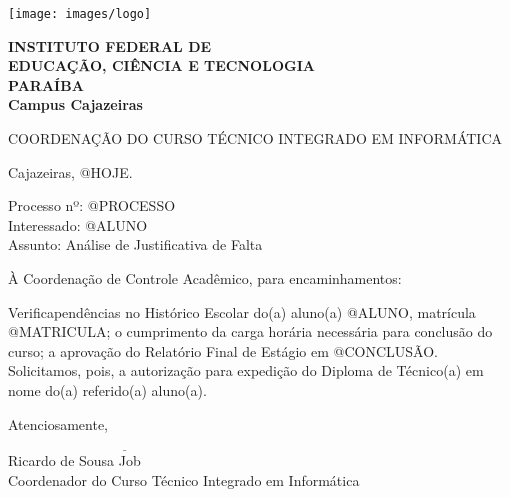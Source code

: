 \documentclass[a4paper, 12pt]{letter}
\begin{document}
\hspace{1.4cm}
\begin{minipage}{.19\textwidth}
    \texttt{[image: images/logo]}
\end{minipage}
\begin{minipage}[t]{\textwidth}
        \vspace{.001cm}
        {\bf
            {\selectfont
                INSTITUTO FEDERAL DE\\
                EDUCAÇÃO, CIÊNCIA E TECNOLOGIA\\
                {\color{green}
                    PARAÍBA\\
                    Campus Cajazeiras
                }
            }
        }
\end{minipage}
{\bf
{\selectfont
    \begin{center}
        {\selectfont
            COORDENAÇÃO DO CURSO TÉCNICO INTEGRADO EM INFORMÁTICA
        }
    \end{center}
}

\begin{flushright}
Cajazeiras, @HOJE.
\end{flushright}

\noindent Processo nº: @PROCESSO\\
Interessado: @ALUNO\\
Assunto: Análise de Justificativa de Falta

\noindent À Coordenação de Controle Acadêmico, para encaminhamentos:

\onehalfspacing Verificapendências no Histórico Escolar do(a) aluno(a)\linebreak
@ALUNO, matrícula @MATRICULA; o cumprimento da carga horária necessária para conclusão do curso; a aprovação do Relatório Final de Estágio  em @CONCLUSÃO. Solicitamos, pois, a autorização para expedição do Diploma de Técnico(a) em nome do(a) referido(a) aluno(a).

Atenciosamente,

\indent $\underline{\hspace{7cm}}$\\
\indent Ricardo de Sousa Job\\
\indent Coordenador do Curso Técnico Integrado em Informática\\
}
\end{document}
